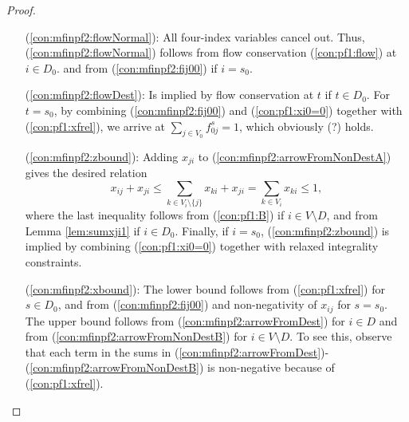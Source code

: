 \begin{proof}
\begin{itemize}[leftmargin=1cm]
\item[(\ref{con:mfinpf2:flowNormal}):] All four-index variables cancel out. Thus, (\ref{con:mfinpf2:flowNormal}) follows from flow conservation (\ref{con:pf1:flow}) at $i\in D_0$. and from (\ref{con:mfinpf2:fij00}) if $i=s_0$.
\item[(\ref{con:mfinpf2:flowDest}):] Is implied by flow conservation at $t$  if $t\in D_0$. For $t=s_0$, by combining (\ref{con:mfinpf2:fij00}) and (\ref{con:pf1:xi0=0}) together with (\ref{con:pf1:xfrel}), we arrive at $\sum_{j\in V_0}f^s_{0j}=1$, which obviously (?) holds. 
\item[ (\ref{con:mfinpf2:zbound}):] %
 Adding $x_{ji}$ to (\ref{con:mfinpf2:arrowFromNonDestA}) gives the desired relation
\[
x_{ij}+x_{ji}\leq\sum_{k\in V_i\setminus\{j\}}x_{ki} +x_{ji}=\sum_{k\in V_i}x_{ki}\leq 1,
\]
where the last inequality follows from (\ref{con:pf1:B}) if $i\in V\setminus D$, and from Lemma \ref{lem:sumxji1} if $i\in D_0$. Finally, if $i=s_0$, (\ref{con:mfinpf2:zbound}) is implied by combining (\ref{con:pf1:xi0=0}) together with relaxed integrality constraints.
\item[ (\ref{con:mfinpf2:xbound}):] The lower bound follows from (\ref{con:pf1:xfrel}) for $s\in D_0$, and from (\ref{con:mfinpf2:fij00}) and non-negativity of $x_{ij}$ for $s=s_0$. The upper bound follows from (\ref{con:mfinpf2:arrowFromDest}) for $i\in D$ and from (\ref{con:mfinpf2:arrowFromNonDestB}) for $i\in V\setminus D$. To see this, observe that each term in the sums in (\ref{con:mfinpf2:arrowFromDest})-(\ref{con:mfinpf2:arrowFromNonDestB}) is non-negative because of (\ref{con:pf1:xfrel}). 

\end{itemize}
\end{proof}
